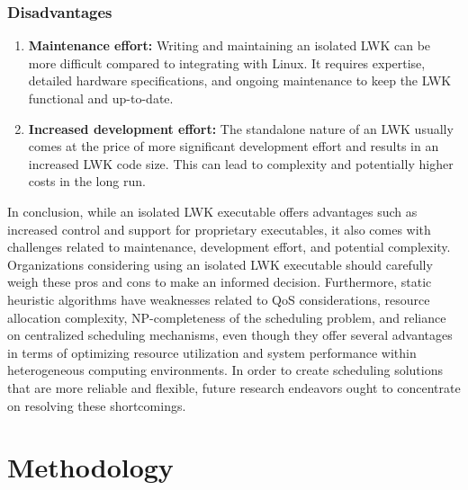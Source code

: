 \documentclass[16pt,a4paper]{article}
\begin{document}
\subsubsection{Disadvantages}
\begin{enumerate}
  \item \textbf{Maintenance effort:} Writing and maintaining an isolated LWK can be more difficult compared to integrating with Linux. It requires expertise, detailed hardware specifications, and ongoing maintenance to keep the LWK functional and up-to-date.
  \item \textbf{Increased development effort:} The standalone nature of an LWK usually comes at the price of more significant development effort and results in an increased LWK code size. This can lead to complexity and potentially higher costs in the long run.
\end{enumerate}

In conclusion, while an isolated LWK executable offers advantages such as increased control and support for proprietary executables, it also comes with challenges related to maintenance, development effort, and potential complexity. Organizations considering using an isolated LWK executable should carefully weigh these pros and cons to make an informed decision. Furthermore, static heuristic algorithms have weaknesses related to QoS considerations, resource allocation complexity, NP-completeness of the scheduling problem, and reliance on centralized scheduling mechanisms, even though they offer several advantages in terms of optimizing resource utilization and system performance within heterogeneous computing environments. In order to create scheduling solutions that are more reliable and flexible, future research endeavors ought to concentrate on resolving these shortcomings.
\clearpage

\section{Methodology}
\end{document}
